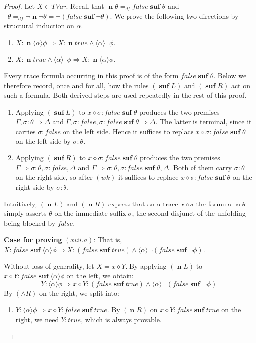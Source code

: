 \documentclass[manuscript,screen]{acmart}
\newcommand{\la}[0]{\langle}
\newcommand{\ra}[0]{\rangle}
\newcommand{\dddef}[0]{=_{df}}
\newcommand{\true}[0]{\mathit{true}}
\newcommand{\false}[0]{\mathit{false}}
\newcommand{\cat}[0]{\diamond}
\DeclareMathOperator{\osuf}{\mathbf{suf}}
\newcommand{\TVar}[0]{\textit{TVar}}
\DeclareMathOperator{\nxt}{\mathbf{n}}
\DeclareMathOperator{\bnxt}{\bar{\nxt}}
\newcommand{\A}[1]{\mbox{ \textbf{#1} }}
\newcommand{\MO}{\A{MO}}
\newcommand{\EMO}{\A{EMO}}
\begin{document}
\begin{proof}

Let $X\in \TVar$. 
Recall that $\nxt\theta\dddef \false\osuf\theta$ and $\bnxt\theta\dddef \neg\nxt\neg\theta = \neg(\false\osuf\neg\theta)$. We prove the following two directions by structural induction on $\alpha$. 
\begin{enumerate}
\item[$(xiii.a)$]  $X : \nxt\la\alpha\ra\phi\Rightarrow X : \nxt\true\wedge \la\alpha\ra\bnxt\phi$.
\item[$(xiii.b)$] $X : \nxt\true\wedge \la\alpha\ra\bnxt\phi\Rightarrow X : \nxt\la\alpha\ra\phi$.
\end{enumerate}

Every trace formula occurring in this proof is of the form $\false\osuf\theta$. 
Below we therefore record, once and for all, how the rules $(\osuf L)$ and $(\osuf R)$ act on such a formula. 
Both derived steps are used repeatedly in the rest of this proof. 
\begin{enumerate}
\item[$(\nxt L)$] Applying $(\osuf L)$ to $x\cat \sigma : \false\osuf\theta$ produces the two premises $\Gamma, \sigma : \theta\Rightarrow \Delta$ and $\Gamma, \sigma : \false, \sigma : \false\osuf\theta\Rightarrow \Delta$. 
The latter is terminal, since it carries $\sigma : \false$ on the left side. 
Hence it suffices to replace $x\cat \sigma : \false\osuf\theta$ on the left side by $\sigma : \theta$. 
\item[$(\nxt R)$] Applying $(\osuf R)$ to $x\cat \sigma : \false\osuf\theta$ produces the two premises $\Gamma\Rightarrow \sigma : \theta, \sigma : \false, \Delta$ and $\Gamma\Rightarrow \sigma : \theta, \sigma : \false\osuf\theta, \Delta$. 
Both of them carry $\sigma : \theta$ on the right side, so after $(wk)$ it suffices to replace $x\cat \sigma : \false\osuf\theta$ on the right side by $\sigma : \theta$. 
\end{enumerate}
Intuitively, $(\nxt L)$ and $(\nxt R)$ express that on a trace $x\cat\sigma$ the formula $\nxt\theta$ simply asserts $\theta$ on the immediate suffix $\sigma$, the second disjunct of the unfolding being blocked by $\false$. 

\textbf{Case for proving $(xiii.a)$}:
That is, $X : \false\osuf\la\alpha\ra\phi\Rightarrow X : (\false\osuf\true)\wedge \la\alpha\ra\neg(\false\osuf\neg\phi)$.

Without loss of generality, let $X = x\cat Y$. 
By applying $(\nxt L)$ to $x\cat Y : \false\osuf\la\alpha\ra\phi$ on the left, we obtain: 
$$
Y : \la\alpha\ra\phi\Rightarrow x\cat Y : (\false\osuf\true)\wedge \la\alpha\ra\neg(\false\osuf\neg\phi)
$$
By $(\wedge R)$ on the right, we split into:
\begin{enumerate}
    \item[(xiii.a.1)] $Y : \la\alpha\ra\phi\Rightarrow x\cat Y : \false\osuf\true$. 
    By $(\nxt R)$ on $x\cat Y : \false\osuf\true$ on the right, we need $Y : \true$, which is always provable. 
    

\end{enumerate}
\end{proof}
\end{document}
